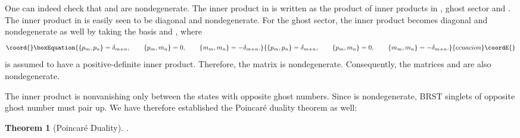 \documentclass[a4paper,12pt]{article}
\providecommand{\norm}[2]{\mbox{\myHighlight{$\langle #1 | #2 \rangle$}\coordHE{}}}
\providecommand{\hN}{\hat{N}^g}
\providecommand{\hQ}{\hat{Q}}
\newtheorem{theorem}{Theorem}[section]
\begin{document}
One can indeed check that \coordHE{} and \coordHE{} are nondegenerate. 
The inner product in \coordHE{} is 
written as the product of inner products in  
\coordHE{}, ghost sector and \coordHE{}.
The inner product in \coordHE{} is easily seen 
to be diagonal and nondegenerate.
For the ghost sector, 
the inner product 
becomes diagonal and nondegenerate as well by taking the
basis \coordHE{} and \coordHE{}, 
where
\begin{equation}\coord{}\boxEquation{
\{ p_m, p_n \} = \delta_{m+n}, \qquad
\{ p_m, m_n \} = 0, \qquad
\{ m_m, m_n \} = -\delta_{m+n}.
\label{eq:diagonal_basis}
}{
\{ p_m, p_n \} = \delta_{m+n}, \qquad
\{ p_m, m_n \} = 0, \qquad
\{ m_m, m_n \} = -\delta_{m+n}.
}{ecuacion}\coordE{}\end{equation}
\coordHE{} is assumed to have a positive-definite inner product.
Therefore, the matrix \myHighlight{$\norm{\varphi_{m}}{\varphi_{n}}$}\coordHE{} is nondegenerate.
Consequently, the matrices \coordHE{} and \coordHE{} are also nondegenerate. 

The inner product is
nonvanishing only between the states with opposite ghost numbers. 
Since \coordHE{} is nondegenerate, BRST singlets of opposite ghost number must 
pair up.
We have therefore established the Poincar\'{e} duality
theorem as well:
\begin{theorem}[Poincar\'{e} Duality]
%
\myHighlight{$ H^{\hN}(\hat{\cal H}, \hQ) = H^{-\hN}(\hat{\cal H}, \hQ) $}\coordHE{}.
\label{lemma:poincare}
%
\end{theorem}
\end{document}
